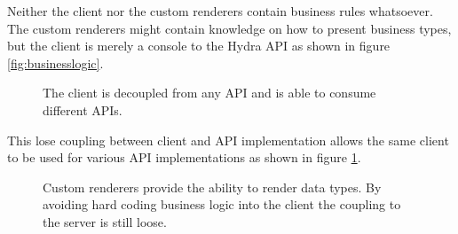 Neither the client nor the custom renderers contain business rules whatsoever. The custom renderers might contain knowledge on how to present business types, but the client is merely a console to the Hydra API as shown in figure \ref{fig:businesslogic}.

\begin{figure}[!htb]
  \caption{The client is decoupled from any API and is able to consume different APIs.}
  \label{fig:losecoupling}
\end{figure}

This lose coupling between client and API implementation allows the same client to be used for various API implementations as shown in figure \ref{fig:losecoupling}.

\begin{figure}[!htb]
  \caption{Custom renderers provide the ability to render data types. By avoiding hard coding business logic into the client the coupling to the server is still loose.}
  \label{fig:linkeddata}
\end{figure}

